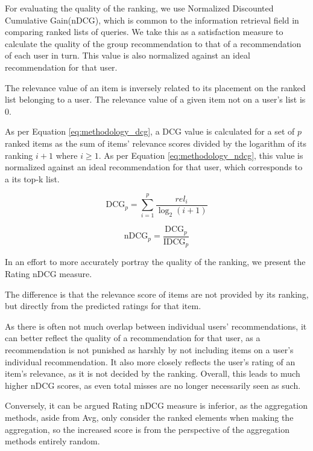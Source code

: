 \label{sec:methodology_ndcg}
For evaluating the quality of the ranking, we use Normalized Discounted Cumulative Gain(nDCG), which is common to the information retrieval field in comparing ranked lists of queries. We take this as a satisfaction measure to calculate the quality of the group recommendation to that of a recommendation of each user in turn. This value is also normalized against an ideal recommendation for that user.


The relevance value of an item is inversely related to its placement on the ranked list belonging to a user. The relevance value of a given item not on a user's list is 0.

As per Equation \ref{eq:methodology_dcg}, a DCG value is calculated for a set of $p$ ranked items as the sum of items' relevance scores divided by the logarithm of its ranking $i + 1$ where $i \geq 1$. As per Equation \ref{eq:methodology_ndcg}, this value is normalized against an ideal recommendation for that user, which corresponds to a its top-k list.

\begin{equation}\label{eq:methodology_dcg}
\text{DCG}_p = \sum_{i=1}^{p}\frac{\textit{rel}_i}{\log_2(i + 1)}
\end{equation}

\begin{equation}\label{eq:methodology_ndcg}
\text{nDCG}_p = \frac{\text{DCG}_p}{\text{IDCG}_p}
\end{equation}

In an effort to more accurately portray the quality of the ranking, we present the Rating nDCG measure.

The difference is that the relevance score of items are not provided by its ranking, but directly from the predicted ratings for that item.

As there is often not much overlap between individual users' recommendations, it can better reflect the quality of a recommendation for that user, as a recommendation is not punished as harshly by not including items on a user's individual recommendation. It also more closely reflects the user's rating of an item's relevance, as it is not decided by the ranking. Overall, this leads to much higher nDCG scores, as even total misses are no longer necessarily seen as such.

Conversely, it can be argued Rating nDCG measure is inferior, as the aggregation methods, aside from Avg, only consider the ranked elements when making the aggregation, so the increased score is from the perspective of the aggregation methods entirely random.